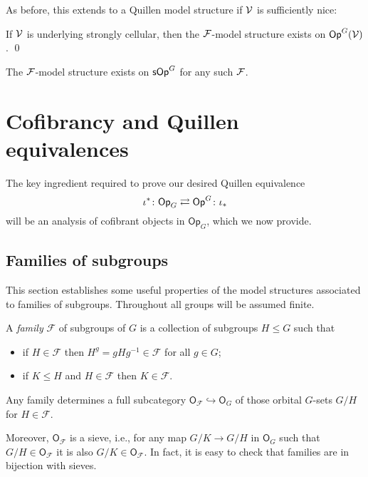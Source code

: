 \documentclass[a4paper,10pt]{article}%
\begin{document}
As before, this extends to a Quillen model structure if $\mathcal V$ is sufficiently nice:
\begin{theorem}
  \label{F_OP_Q_MODEL_THM}
  If $\mathcal V$ is underlying strongly cellular,%
then the $\mathcal F$-model structure exists on $\mathsf{Op}^G(\mathcal V)$. \qed
\end{theorem}

\begin{example}
  The $\mathcal F$-model structure exists on $\mathsf{sOp}^G$ for any such $\mathcal F$.
\end{example}





\section{Cofibrancy and Quillen equivalences}\label{COFIB SEC}



The key ingredient required to prove our desired Quillen equivalence
\[
	\iota^{\**} \colon
	\mathsf{Op}_G \rightleftarrows \mathsf{Op}^G
	\colon \iota_{\**}
\]
will be an analysis of cofibrant objects in $\mathsf{Op}_G$, which we now provide.


\subsection{Families of subgroups}


This section establishes some useful properties of the model structures associated to families of subgroups. Throughout all groups will be assumed finite.


\begin{definition}\label{FAMILY DEF}
	A \textit{family} $\mathcal{F}$ of subgroups of $G$ is a collection of subgroups 
	$H \leq G$ such that
	\begin{itemize}
	\item if $H \in \mathcal{F}$ then 
	$H^g = gHg^{-1} \in \mathcal{F}$ for all $g \in G$;
	\item if $K \leq H$ and $H \in \mathcal{F}$ then
	$K \in \mathcal{F}$.
	\end{itemize} 
\end{definition}

\begin{remark}\label{SIEVE REM}
	Any family determines a full subcategory 
	$\mathsf{O}_{\mathcal{F}} \hookrightarrow \mathsf{O}_G$
	of those orbital $G$-sets $G/H$ for 
	$H \in \mathcal{F}$.
	
	Moreover, $\mathsf{O}_{\mathcal{F}}$ is a sieve, i.e., for any map $G/K \to G/H$ in $\mathsf{O}_G$ such that $G/H \in \mathsf{O}_{\mathcal{F}}$ it is also $G/K \in \mathsf{O}_{\mathcal{F}}$. In fact, it is easy to check that families are in bijection with sieves.
\end{remark}
\end{document}
